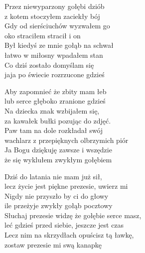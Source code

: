 \begin{text}
    Przez niewyparzony gołębi dziób\\
    z kotem stoczyłem zaciekły bój\\
    Gdy od sierściuchów wyzwałem go\\
    oko straciłem stracił i on\\
    Był kiedyś ze mnie gołąb na schwał\\
    łatwo w miłosny wpadałem stan\\
    Co dziś zostało domyślam się\\
    jaja po świecie rozrzucone gdzieś

    Aby zapomnieć że zbity mam łeb\\
    lub serce głęboko zranione gdzieś\\
    Na dziecka znak wzbijałem się,\\
    za kawałek bułki pozując do zdjęć.\\
    Paw tam na dole rozkładał swój\\
    wachlarz z przepięknych olbrzymich piór\\
    Ja Bogu dziękuję zawsze i wszędzie\\
    że się wyklułem zwykłym gołębiem

    Dziś do latania nie mam już sił,\\
    lecz życie jest piękne prezesie, uwierz mi\\
    Nigdy nie przyszło by ci do głowy\\ 
    ile przeżyje zwykły gołąb pocztowy\\
    Słuchaj prezesie widzę że gołębie serce masz,\\ 
    leć gdzieś przed siebie, jeszcze jest czas\\
    Lecz nim na skrzydłach opuścisz tą ławkę,\\
    zostaw prezesie mi swą kanapkę


\end{text}
